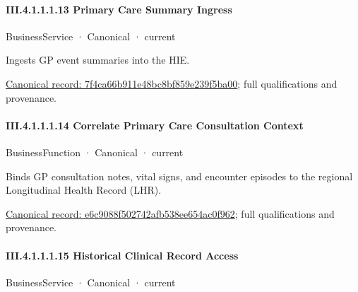 \paragraph*{III.4.1.1.1.13 Primary Care Summary Ingress}
\label{navigation:III.4.1.1.1.13}

\label{element:7f4ca66b911e48bc8bf859e239f5ba00}
{\small BusinessService · Canonical · current}\par

Ingests GP event summaries into the HIE.


{\footnotesize \href{../../../../../../../../continuum/business/business-service/7f4ca66b911e48bc8bf859e239f5ba00.md}{Canonical record: 7f4ca66b911e48bc8bf859e239f5ba00}; full qualifications and provenance.}\par
\paragraph*{III.4.1.1.1.14 Correlate Primary Care Consultation Context}
\label{navigation:III.4.1.1.1.14}

\label{element:e6c9088f502742afb538ee654ac0f962}
{\small BusinessFunction · Canonical · current}\par

Binds GP consultation notes, vital signs, and encounter episodes to the regional Longitudinal Health Record (LHR).


{\footnotesize \href{../../../../../../../../continuum/business/business-function/e6c9088f502742afb538ee654ac0f962.md}{Canonical record: e6c9088f502742afb538ee654ac0f962}; full qualifications and provenance.}\par
\paragraph*{III.4.1.1.1.15 Historical Clinical Record Access}
\label{navigation:III.4.1.1.1.15}

\label{element:be4938981b43403282694631b40f0bb2}
{\small BusinessService · Canonical · current}\par

